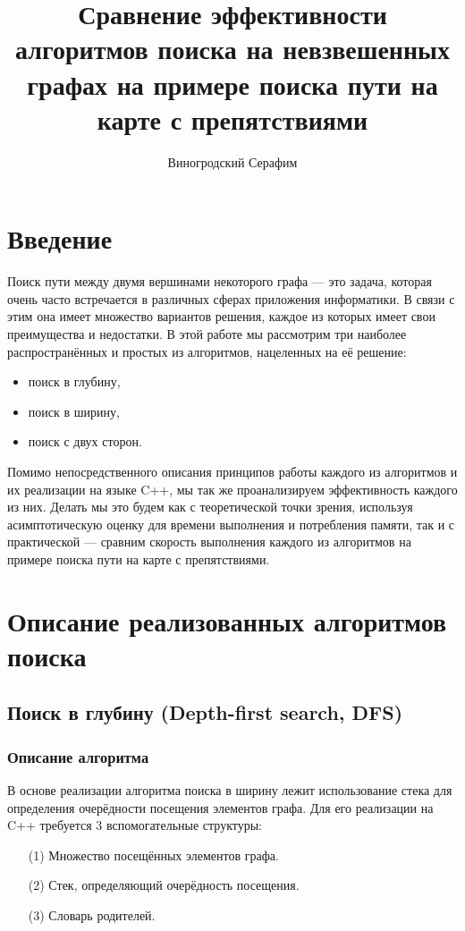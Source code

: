 \documentclass[a4paper, 12pt]{article}
\title{Сравнение эффективности алгоритмов поиска на невзвешенных графах на примере поиска пути на карте с препятствиями}
\author{Виногродский Серафим}
\begin{document}
\begin{titlepage}
    \maketitle
    \tableofcontents
    \thispagestyle{empty}
\end{titlepage}

\section{Введение}
Поиск пути между двумя вершинами некоторого графа --- это задача, которая очень часто встречается в различных сферах приложения информатики. В связи с этим она имеет множество вариантов решения, каждое из которых имеет свои преимущества и недостатки.
В этой работе мы рассмотрим три наиболее распространённых и простых из алгоритмов, нацеленных на её решение:
\begin{itemize}
    \item поиск в глубину,
    \item поиск в ширину,
    \item поиск с двух сторон.
\end{itemize}

Помимо непосредственного описания принципов работы каждого из алгоритмов и их реализации на языке C++, мы так же проанализируем эффективность каждого из них. Делать мы это будем как с теоретической точки зрения, используя асимптотическую оценку для времени выполнения и потребления памяти, так и с практической --- сравним скорость выполнения каждого из алгоритмов на примере поиска пути на карте с препятствиями.

\section{Описание реализованных алгоритмов поиска}
\subsection{Поиск в глубину (Depth-first search, DFS)}
\subsubsection{Описание алгоритма}
\label{ssub:DFS_algorithm}
В основе реализации алгоритма поиска в ширину лежит использование стека для определения очерёдности посещения элементов графа. Для его реализации на C++ требуется 3 вспомогательные структуры:
\begin{itemize}
    \item[(1)] Множество посещённых элементов графа.
    \item[(2)] Стек, определяющий очерёдность посещения.
    \item[(3)] Словарь родителей.
\end{itemize}
\end{document}

